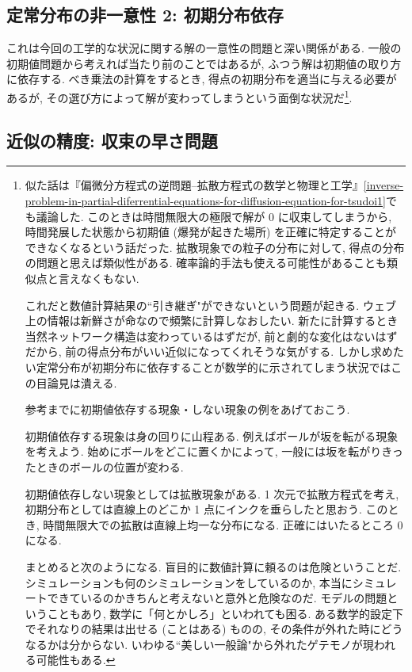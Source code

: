 \documentclass[openany, a4paper, oneside]{jsbook}
\begin{document}
\subsection{定常分布の非一意性 2: 初期分布依存}

これは今回の工学的な状況に関する解の一意性の問題と深い関係がある.
一般の初期値問題から考えれば当たり前のことではあるが,
ふつう解は初期値の取り方に依存する.
べき乗法の計算をするとき, 得点の初期分布を適当に与える必要があるが,
その選び方によって解が変わってしまうという面倒な状況だ\footnote{似た話は『偏微分方程式の逆問題--拡散方程式の数学と物理と工学』\ref{inverse-problem-in-partial-diferrential-equations-for-diffusion-equation-for-tsudoi1}でも議論した.
このときは時間無限大の極限で解が 0 に収束してしまうから,
時間発展した状態から初期値 (爆発が起きた場所) を正確に特定することができなくなるという話だった.
拡散現象での粒子の分布に対して, 得点の分布の問題と思えば類似性がある.
確率論的手法も使える可能性があることも類似点と言えなくもない.

これだと数値計算結果の``引き継ぎ"ができないという問題が起きる.
ウェブ上の情報は新鮮さが命なので頻繁に計算しなおしたい.
新たに計算するとき当然ネットワーク構造は変わっているはずだが,
前と劇的な変化はないはずだから, 前の得点分布がいい近似になってくれそうな気がする.
しかし求めたい定常分布が初期分布に依存することが数学的に示されてしまう状況ではこの目論見は潰える.

\begin{rem}
参考までに初期値依存する現象・しない現象の例をあげておこう.

初期値依存する現象は身の回りに山程ある.
例えばボールが坂を転がる現象を考えよう.
始めにボールをどこに置くかによって,
一般には坂を転がりきったときのボールの位置が変わる.

初期値依存しない現象としては拡散現象がある.
1 次元で拡散方程式を考え, 初期分布としては直線上のどこか 1 点にインクを垂らしたと思おう.
このとき, 時間無限大での拡散は直線上均一な分布になる.
正確にはいたるところ 0 になる.
\end{rem}

まとめると次のようになる.
盲目的に数値計算に頼るのは危険ということだ.
シミュレーションも何のシミュレーションをしているのか,
本当にシミュレートできているのかきちんと考えないと意外と危険なのだ.
モデルの問題ということもあり, 数学に「何とかしろ」といわれても困る.
ある数学的設定下でそれなりの結果は出せる (ことはある) ものの,
その条件が外れた時にどうなるかは分からない.
いわゆる``美しい一般論"から外れたゲテモノが現われる可能性もある.}.
\subsection{近似の精度: 収束の早さ問題}
\end{document}
